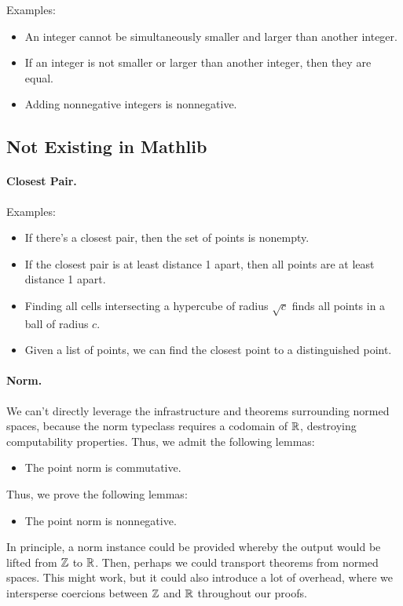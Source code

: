 \documentclass{article}
\begin{document}
Examples:
\begin{itemize}
  \item An integer cannot be simultaneously smaller and larger than another integer.
  \item If an integer is not smaller or larger than another integer, then they are equal.
  \item Adding nonnegative integers is nonnegative.
\end{itemize}

\subsection{Not Existing in Mathlib}
\paragraph{Closest Pair.}
Examples:
\begin{itemize}
  \item If there's a closest pair, then the set of points is nonempty.
  \item If the closest pair is at least distance 1 apart, then all points are at least distance 1 apart.
  \item Finding all cells intersecting a hypercube of radius $\sqrt{c}$ finds all points in a ball of radius $c$.
  \item Given a list of points, we can find the closest point to a distinguished point.
\end{itemize}

\paragraph{Norm.}
We can't directly leverage the infrastructure and theorems surrounding normed spaces, because the norm typeclass requires a codomain of $\mathbb{R}$, destroying computability properties.
Thus, we admit the following lemmas:
\begin{itemize}
  \item The point norm is commutative.
\end{itemize}
Thus, we prove the following lemmas:
\begin{itemize}
  \item The point norm is nonnegative.
\end{itemize}
In principle, a norm instance could be provided whereby the output would be lifted from $\mathbb{Z}$ to $\mathbb{R}$.
Then, perhaps we could transport theorems from normed spaces.
This might work, but it could also introduce a lot of overhead, where we intersperse coercions between $\mathbb{Z}$ and $\mathbb{R}$ throughout our proofs.
\end{document}
